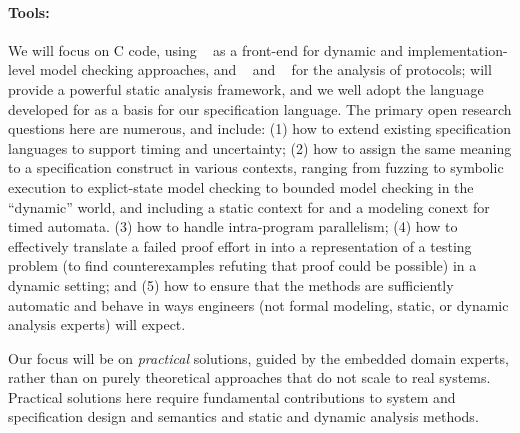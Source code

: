 \paragraph{Tools:} We will focus on C code, using \deepstate~\cite{DeepState}
as a front-end for dynamic and implementation-level model checking approaches, and
\uppaal~\cite{uppaal} and
\prism~\cite{KNP2011:CAV} for the analysis of protocols; \framac will
provide a powerful static analysis framework, and we well adopt the
\acsl language developed for \framac as a basis for our specification language.  The primary open research questions here are numerous, and include:
(1) how to extend existing specification languages to support timing and uncertainty;
(2) how to assign the same meaning to a specification construct in
  various contexts, ranging from fuzzing to symbolic execution to
  explict-state model checking to bounded model checking in the
  ``dynamic'' \deepstate world, and including a static context for
  \framac and a modeling conext for timed automata.
(3) how to handle intra-program parallelism;
(4) how to effectively translate a failed proof effort in \framac
  into a representation of a testing problem (to find counterexamples
  refuting that proof could be possible) in a dynamic setting; and
(5) how to ensure that the methods are sufficiently automatic
  and behave in ways engineers (not formal modeling, static, or dynamic
  analysis experts) will expect.

Our focus will be on \emph{practical} solutions, guided by the
embedded domain experts, rather than on purely theoretical approaches
that do not scale to real systems. Practical solutions here require
fundamental contributions to system and specification design and
semantics and static and dynamic analysis methods.